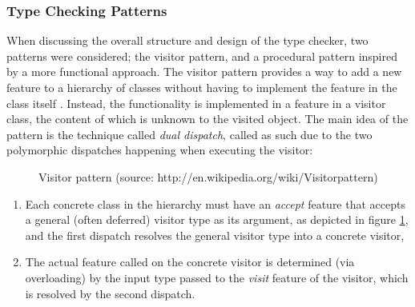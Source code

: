 \subsubsection{Type Checking Patterns}
When discussing the overall structure and design of the type checker, two patterns were considered; the visitor pattern, and a procedural pattern inspired by a more functional approach.
The visitor pattern provides a way to add a new feature to a hierarchy of classes without having to implement the feature in the class itself \cite{martin2002}. Instead, the functionality is implemented in a feature in a visitor class, the content of which is unknown to the visited object. The main idea of the pattern is the technique called \textit{dual dispatch}, called as such due to the two polymorphic dispatches happening when executing the visitor: 
\begin{figure}[H]
    \caption[Visitor pattern]{Visitor pattern (source: http://en.wikipedia.org/wiki/Visitor\textunderscore pattern)}
    \label{fig:visitor-pattern}
\end{figure}
\begin{enumerate}
\item Each concrete class in the hierarchy must have an \textit{accept} feature that accepts a general (often deferred) visitor type as its argument, as depicted in figure \ref{fig:visitor-pattern}, and the first dispatch resolves the general visitor type into a concrete visitor,
\item The actual feature called on the concrete visitor is determined (via overloading) by the input type passed to the \textit{visit} feature of the visitor, which is resolved by the second dispatch.  
\end{enumerate}
